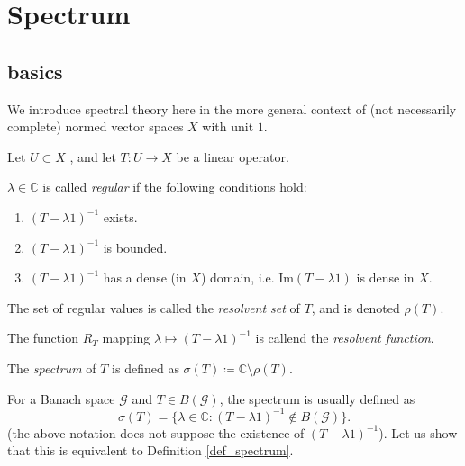 \documentclass[12pt]{article}
\begin{document}
\section{Spectrum} %
\begin{refsection}

\subsection{basics} %

We introduce spectral theory here in the more general context of (not necessarily complete) normed vector spaces $X$ with unit $1$.

Let $U\subset X$ , and let $T:U \to X$ be a linear operator.

\begin{definition} %
	$\lambda\in\mathbb{C}$ is called \emph{regular} if the following conditions hold:
	\begin{enumerate}[label=R\arabic*.,ref=R\arabic*]
		\item\label{def_regular_exists} $(T-\lambda 1)^{-1}$ exists.
		\item\label{def_regular_bounded} $(T-\lambda 1)^{-1}$ is bounded.
		\item\label{def_regular_dense} $(T-\lambda 1)^{-1}$ has a dense (in $X$) domain, i.e. $\text{Im}(T-\lambda 1)$ is dense in $X$.
	\end{enumerate}
\end{definition}

\begin{definition} %
\label{def_resolvent_set}
	The set of regular values is called the \emph{resolvent set} of $T$, and is denoted $\rho(T)$.
\end{definition}

\begin{definition} %
	The function $R_T$ mapping $\lambda \mapsto (T-\lambda 1)^{-1}$ is callend the \emph{resolvent function}.
\end{definition}

\begin{definition} %
\label{def_spectrum}
	The \emph{spectrum} of $T$ is defined as $\sigma(T) \coloneqq \mathbb{C} \setminus \rho(T)$. 
\end{definition}

\begin{remark}
\label{rmk_banach_space_spectrum_def_equivalent}
	For a Banach space $\mathcal{G}$ and $T\in B(\mathcal{G})$, the spectrum is usually defined as 
	\begin{equation*}
		\sigma(T) = \{ \lambda\in\mathbb{C} : (T-\lambda 1)^{-1} \not\in B(\mathcal{G}) \}.
	\end{equation*}
	(the above notation does not suppose the existence of $(T-\lambda 1)^{-1}$). Let us show that this is equivalent to Definition \ref{def_spectrum}. 


\end{remark}
\end{refsection}
\end{document}
